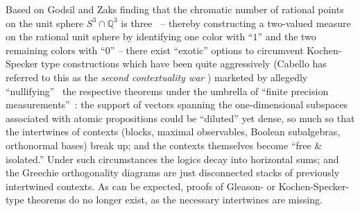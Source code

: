 Based on Godsil and Zaks finding that the chromatic number of rational points on the  unit sphere
$S^3\cap \mathbb{Q}^3$
is three~\cite[Lemma~1.2]{godsil-zaks} -- thereby constructing a two-valued measure on the rational unit sphere
by identifying one color with ``$1$'' and the two remaining colors with ``$0$'' --
there exist ``exotic'' options to circumvent Kochen-Specker type constructions which have been quite aggressively (Cabello has referred to this
as the {\em second contextuality war} \cite{Cabello-talk-Vajo-2017})
marketed by allegedly ``nullifying''~\cite{meyer:99} the respective theorems
under the umbrella of ``finite precision measurements''~\cite{kent:99,clifton:99,mermin-99iks,Breuer-02a,Breuer-02b,Barrett-2004}:
the support of vectors spanning the one-dimensional subspaces associated with atomic propositions could be ``diluted'' yet dense,
so much so that the intertwines of contexts (blocks, maximal observables, Boolean subalgebras, orthonormal bases) break up;
and the contexts themselves become ``free \& isolated.''
Under such circumstances the logics decay into horizontal sums;
and the Greechie orthogonality diagrams are just disconnected stacks of previously intertwined contexts.
As can be expected, proofs of Gleason- or Kochen-Specker-type theorems do no longer exist,
as the necessary intertwines are missing.


